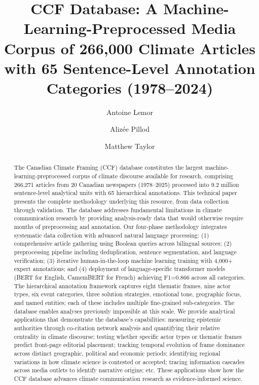\documentclass[12pt]{article}
\title{\textbf{CCF Database: A Machine-Learning-Preprocessed Media Corpus of 266,000 Climate Articles with 65 Sentence-Level Annotation Categories (1978–2024)}}
\author[1]{Antoine Lemor}
\author[2]{Alizée Pillod}
\author[2]{Matthew Taylor}
\affil[1]{Université de Sherbrooke}
\affil[2]{Université de Montréal}
\date{}
\begin{document}
\maketitle
\thispagestyle{empty}


\begin{abstract}
\noindent
The Canadian Climate Framing (CCF) database constitutes the largest machine-learning-preprocessed corpus of climate discourse available for research, comprising 266,271 articles from 20 Canadian newspapers (1978–2025) processed into 9.2 million sentence-level analytical units with 65 hierarchical annotations. This technical paper presents the complete methodology underlying this resource, from data collection through validation. The database addresses fundamental limitations in climate communication research by providing analysis-ready data that would otherwise require months of preprocessing and annotation. Our four-phase methodology integrates systematic data collection with advanced natural language processing: (1) comprehensive article gathering using Boolean queries across bilingual sources; (2) preprocessing pipeline including deduplication, sentence segmentation, and language verification; (3) iterative human-in-the-loop machine learning training with 4,000+ expert annotations; and (4) deployment of language-specific transformer models (BERT for English, CamemBERT for French) achieving F1=0.866 across all categories. The hierarchical annotation framework captures eight thematic frames, nine actor types, six event categories, three solution strategies, emotional tone, geographic focus, and named entities; each of these includes multiple fine-grained sub-categories. The database enables analyses previously impossible at this scale. We provide analytical applications that demonstrate the database's capabilities: measuring epistemic authorities through co-citation network analysis and quantifying their relative centrality in climate discourse; testing whether specific actor types or thematic frames predict front-page editorial placement; tracking temporal evolution of frame dominance across distinct geographic, political and economic periods; identifying regional variations in how climate science is contested or accepted; tracing information cascades across media outlets to identify narrative origins; etc. These applications show how the CCF database advances climate communication research as evidence-informed science. 
\end{abstract}

\newpage
\tableofcontents
\newpage
\end{document}
